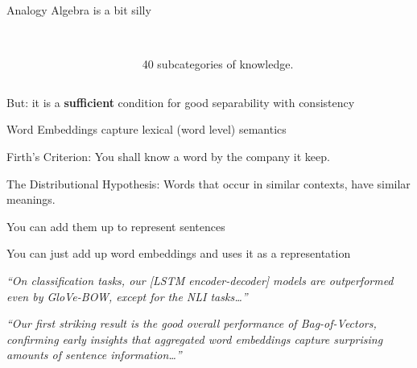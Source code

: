 \documentclass[dvipsnames]{beamer}
\renewcommand{\emph}{\alert}
\newcommand{\countertitle}[1]{\vfill\vfill{\centering \Large \color{bluewrite} #1}\vspace{-0.5cm}}
\newcommand{\mquote}[1]{\textit{``#1''}}
\begin{document}
\begin{frame}{Analogy Algebra is a bit silly}
\begin{columns}
	\begin{column}{0.5\textwidth}
	\end{column}
	\begin{column}{0.5\textwidth}
		\\
		\vspace{1cm}
		\emph{40 subcategories} of knowledge.
	\end{column}
\end{columns}

\countertitle{But: it is a \textbf{sufficient} condition for good separability with consistency}
\end{frame}

\begin{frame}{Word Embeddings capture lexical (word level) semantics}
	\begin{block}{Firth's Criterion: }
		You shall know a word by the company it keep.
	\end{block}
	\vspace{1cm}
	\begin{block}{The Distributional Hypothesis:}
		Words that occur in similar \emph{contexts}, have similar \emph{meanings}.
	\end{block}
\countertitle{You can add them up to represent sentences}
\end{frame}




\begin{frame}{You can just add up word embeddings and uses it as a representation}
	\begin{block}{\normalsize {}}
		\mquote{On classification tasks,  our [LSTM encoder-decoder] models
			are outperformed even by GloVe-BOW, except
			for the NLI tasks\ldots}
	\end{block}
	
	\begin{block}{\normalsize {}}
		\mquote{Our first striking result is the good overall performance
			of Bag-of-Vectors, confirming early insights
			that aggregated word embeddings capture
			surprising amounts of sentence information\ldots}
	\end{block}
\end{frame}
\end{document}
